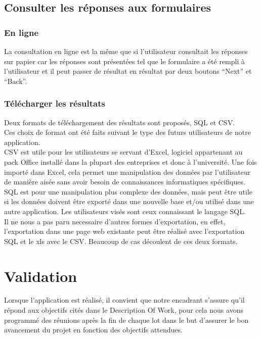\documentclass{sigplanconf}
\begin{document}
\subsection{Consulter les réponses aux formulaires}
\subsubsection{En ligne}
La consultation en ligne est la même que si l'utilisateur consultait les réponses sur papier car les réponses sont présentées tel que le formulaire a été rempli à l'utilisateur et il peut passer de résultat en résultat par deux boutons ``Next'' et ``Back''.

\subsubsection{Télécharger les résultats}
Deux formats de téléchargement des résultats sont proposés, SQL et CSV.\\
Ces choix de format ont été faits suivant le type des futurs utilisateurs de notre application.\\
CSV est utile pour les utilisateurs se servant d'Excel, logiciel appartenant au pack Office installé dans la plupart des entreprises et donc à l'université. Une fois importé dans Excel, cela permet une manipulation des données par l'utilisateur de manière aisée sans avoir besoin de connaissances informatiques spécifiques.\\
SQL est pour une manipulation plus complexe des données, mais peut être utile si les données doivent être exporté dans une nouvelle base et/ou utilisé dans une autre application. Les utilisateurs visés sont ceux connaissant le langage SQL.\\
Il ne nous a pas paru necessaire d'autres formes d'exportation, en effet, l'exportation dans une page web existante peut être réalisé avec l'exportation SQL et le xls avec le CSV. Beaucoup de cas découlent de ces deux formats.

\section{Validation}
Lorsque l'application est réalisé, il convient que notre encadrant s'assure qu'il répond aux objectifs cités dans le Description Of Work, pour cela nous avons programmé des réunions après la fin de chaque lot dans le but d’assurer le bon avancement du projet en fonction des objectifs attendues.
\end{document}
